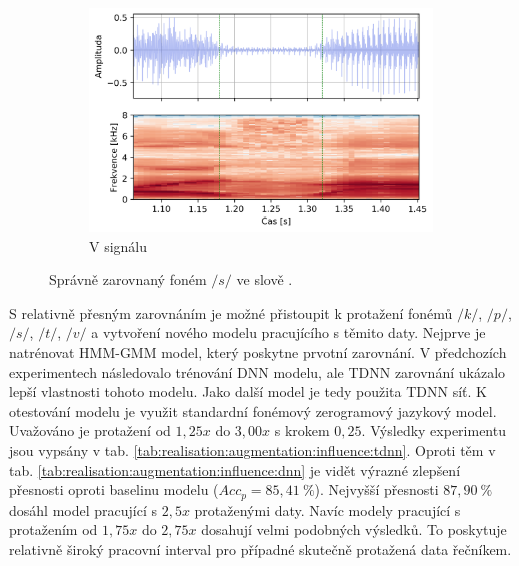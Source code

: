 \begin{figure}[htpb]
\begin{subfigure}[b]{0.65\textwidth}
    \includegraphics[width=\textwidth]{./ch6-realisation/img/energy_spec_word-segment-2.png}
    \caption{V signálu}
    \label{fig:realisation:augmentation:alignemnt:correct:audio}
  \end{subfigure}
  \caption{Správně zarovnaný foném $/s/$ ve slově .}
  \label{fig:realisation:augmentation:alignemnt:correct}
\end{figure}

S relativně přesným zarovnáním je možné přistoupit k protažení fonémů $/k/$, $/p/$, $/s/$, $/t/$, $/v/$ a vytvoření nového modelu pracujícího s těmito daty. Nejprve je natrénovat HMM-GMM model, který poskytne prvotní zarovnání. V předchozích experimentech následovalo trénování DNN modelu, ale TDNN zarovnání ukázalo lepší vlastnosti tohoto modelu. Jako další model je tedy použita TDNN síť. K otestování modelu je využit standardní fonémový zerogramový jazykový model. Uvažováno je protažení od $1,25x$ do $3,00x$ s krokem $0,25$. Výsledky experimentu jsou vypsány v tab. \ref{tab:realisation:augmentation:influence:tdnn}. Oproti těm v tab. \ref{tab:realisation:augmentation:influence:dnn} je vidět výrazné zlepšení přesnosti oproti baselinu modelu ($Acc_{p} = 85,41\ \%$). Nejvyšší přesnosti $87,90\ \%$ dosáhl model pracující s $2,5x$ protaženými daty. Navíc modely pracující s protažením od $1,75x$ do $2,75x$ dosahují velmi podobných výsledků. To poskytuje relativně široký pracovní interval pro případné skutečně protažená data řečníkem.


